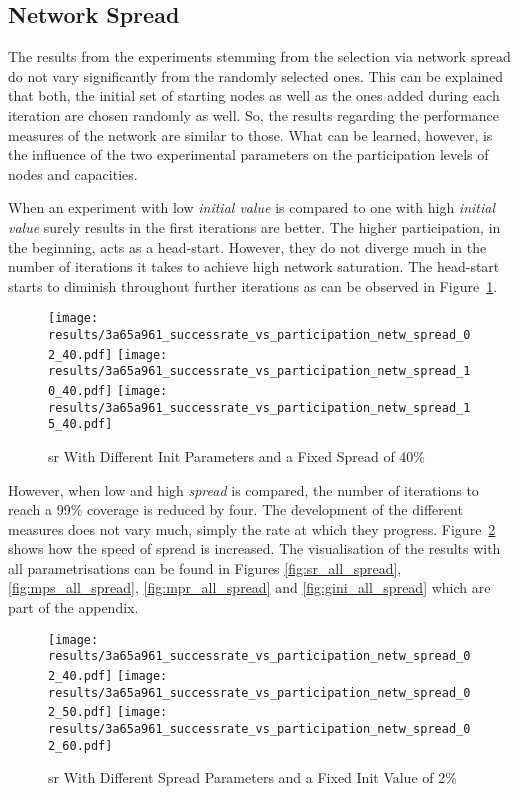 \documentclass[final]{fhnwreport}       %
\begin{document}
\subsection{Network Spread}
The results from the experiments stemming from the selection via network spread do not vary significantly from the randomly selected ones. This can be explained that both, the initial set of starting nodes as well as the ones added during each iteration are chosen randomly as well. So, the results regarding the performance measures of the network are similar to those. What can be learned, however, is the influence of the two experimental parameters on the participation levels of nodes and capacities.

When an experiment with low \emph{initial value} is compared to one with high \emph{initial value} surely results in the first iterations are better. The higher participation, in the beginning, acts as a head-start. However, they do not diverge much in the number of iterations it takes to achieve high network saturation. The head-start starts to diminish throughout further iterations as can be observed in Figure~\ref{fig:fix_spread}.

\begin{figure}[htp]
\centering
  \texttt{[image: results/3a65a961\_successrate\_vs\_participation\_netw\_spread\_02\_40.pdf]} 
  \texttt{[image: results/3a65a961\_successrate\_vs\_participation\_netw\_spread\_10\_40.pdf]} 
  \texttt{[image: results/3a65a961\_successrate\_vs\_participation\_netw\_spread\_15\_40.pdf]}
\caption{\gls{sr} With Different Init Parameters and a Fixed Spread of 40\%}
\label{fig:fix_spread}
\end{figure}

However, when low and high \emph{spread} is compared, the number of iterations to reach a 99\% coverage is reduced by four. The development of the different measures does not vary much, simply the rate at which they progress. Figure~\ref{fig:fix_init} shows how the speed of spread is increased. The visualisation of the results with all parametrisations can be found in Figures \ref{fig:sr_all_spread}, \ref{fig:mps_all_spread}, \ref{fig:mpr_all_spread} and \ref{fig:gini_all_spread} which are part of the appendix.


\newpage
\begin{figure}[htp]
\centering
  \texttt{[image: results/3a65a961\_successrate\_vs\_participation\_netw\_spread\_02\_40.pdf]} 
  \texttt{[image: results/3a65a961\_successrate\_vs\_participation\_netw\_spread\_02\_50.pdf]} 
  \texttt{[image: results/3a65a961\_successrate\_vs\_participation\_netw\_spread\_02\_60.pdf]}
\caption{\gls{sr} With Different Spread Parameters and a Fixed Init Value of 2\%}
\label{fig:fix_init}
\end{figure}
\end{document}
